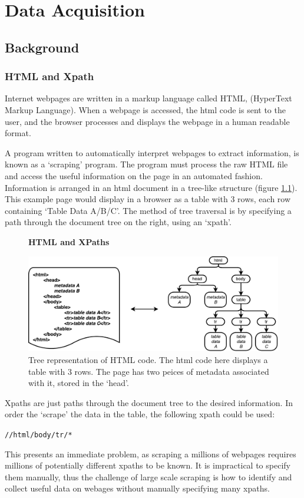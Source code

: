 \chapter{Data Acquisition}
\label{chapt:DATA_ACQUISITION}
\section{Background}
\subsection{HTML and Xpath}

Internet webpages are written in a markup language called HTML, (HyperText Markup Language). When a webpage is accessed, the html code is sent to the user, and the browser processes and displays the webpage in a human readable format. 

A program written to automatically interpret webpages to extract information, is known as a `scraping' program. The program must process the raw HTML file and access the useful information on the page in an automated fashion. Information is arranged in an html document in a tree-like structure (figure \ref{fig:HTMLTREE}). This example page would display in a browser as a table with 3 rows, each row containing `Table Data A/B/C'. The method of tree traversal is by specifying a path through the document tree on the right, using an `xpath'. 
\begin{figure}[H]
    \centering
    \textbf{HTML and XPaths}\par\medskip
    \includegraphics[width=\textwidth]{Data_Acquisition/html_tree.pdf}
    \caption[Tree representation of HTML Code]{Tree representation of HTML code. The html code here displays a table with 3 rows. The page has two peices of metadata associated with it, stored in the `head'.}
        \label{fig:HTMLTREE}

\end{figure}
Xpaths are just paths through the document tree to the desired information. In order the `scrape' the data in the table, the following xpath could be used:
\begin{center}
\texttt{//html/body/tr/*}
\end{center}
This presents an immediate problem, as scraping a millions of webpages requires millions of potentially different xpaths to be known. It is impractical to specify them manually, thus the challenge of large scale scraping is how to identify and collect useful data on webages without manually specifying many xpaths.
